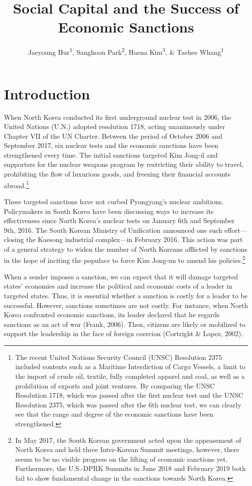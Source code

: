 \documentclass[
  english,
  man]{apa6}
\title{Social Capital and the Success of Economic Sanctions}
\author{Jaeyoung Hur\textsuperscript{1}, Sanghoon Park\textsuperscript{2}, Haena Kim\textsuperscript{3}, \& Taehee Whang\textsuperscript{1}}
\date{}
\affiliation{\vspace{0.5cm}\textsuperscript{1} Yonsei University\\\textsuperscript{2} University of South Carolina, Columbia\\\textsuperscript{3} Unknown University}
\begin{document}
\maketitle

\hypertarget{introduction}{%
\section{Introduction}\label{introduction}}

When North Korea conducted its first underground nuclear test in 2006, the United Nations (U.N.) adopted resolution 1718, acting unanimously under Chapter VII of the UN Charter. Between the period of October 2006 and September 2017, six nuclear tests and the economic sanctions have been strengthened every time. The initial sanctions targeted Kim Jong-il and supporters for the nuclear weapons program by restricting their ability to travel, prohibiting the flow of luxurious goods, and freezing their financial accounts abroad.\footnote{The recent United Nations Security Council (UNSC) Resolution 2375 included contents such as a Maritime Interdiction of Cargo Vessels, a limit to the import of crude oil, textile, fully completed apparel and coal, as well as a prohibition of exports and joint ventures. By comparing the UNSC Resolution 1718, which was passed after the first nuclear test and the UNSC Resolution 2375, which was passed after the 6th nuclear test, we can clearly see that the range and degree of the economic sanctions have been strengthened.}

These targeted sanctions have not curbed Pyongyang's nuclear ambitions. Policymakers in South Korea have been discussing ways to increase its effectiveness since North Korea's nuclear tests on January 6th and September 9th, 2016. The South Korean Ministry of Unification announced one such effort---closing the Kaesong industrial complex---in February 2016. This action was part of a general strategy to widen the number of North Koreans afflicted by sanctions in the hope of inciting the populace to force Kim Jong-un to amend his policies.\footnote{In May 2017, the South Korean government acted upon the appeasement of North Korea and held three Inter-Korean Summit meetings, however, there seems to be no visible progress on the lifting of economic sanctions yet. Furthermore, the U.S.-DPRK Summits in June 2018 and February 2019 both fail to show fundamental change in the sanctions towards North Korea.}

When a sender imposes a sanction, we can expect that it will damage targeted states' economies and increase the political and economic costs of a leader in targeted states. Thus, it is essential whether a sanction is costly for a leader to be successful. However, sanctions sometimes are not costly. For instance, when North Korea confronted economic sanctions, its leader declared that he regards sanctions as an act of war (Frank, 2006). Then, citizens are likely or mobilized to support the leadership in the face of foreign coercion (Cortright \& Lopez, 2002).
\end{document}
